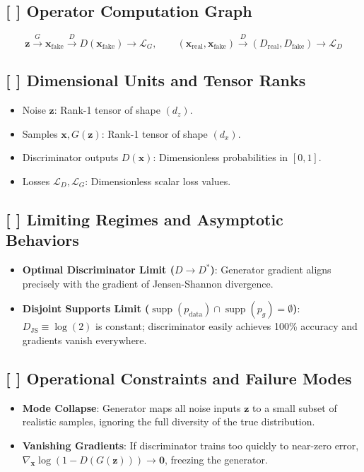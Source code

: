 \documentclass[11pt,a4paper]{article}
\theoremstyle{definition}
\begin{document}
\subsection{[ ] Operator Computation Graph}
{\boldmath
\begin{equation}
\mathbf{z} \xrightarrow{G} \mathbf{x}_{\text{fake}} \xrightarrow{D} D(\mathbf{x}_{\text{fake}}) \longrightarrow \mathcal{L}_G, \qquad (\mathbf{x}_{\text{real}}, \mathbf{x}_{\text{fake}}) \xrightarrow{D} (D_{\text{real}}, D_{\text{fake}}) \longrightarrow \mathcal{L}_D
\end{equation}
}

\subsection{[ ] Dimensional Units and Tensor Ranks}
\begin{itemize}
    \item Noise $\mathbf{z}$: Rank-1 tensor of shape $(d_z)$.
    \item Samples $\mathbf{x}, G(\mathbf{z})$: Rank-1 tensor of shape $(d_x)$.
    \item Discriminator outputs $D(\mathbf{x})$: Dimensionless probabilities in $[0, 1]$.
    \item Losses $\mathcal{L}_D, \mathcal{L}_G$: Dimensionless scalar loss values.
\end{itemize}

\subsection{[ ] Limiting Regimes and Asymptotic Behaviors}
\begin{itemize}
    \item \textbf{Optimal Discriminator Limit ($D \to D^*$)}: Generator gradient aligns precisely with the gradient of Jensen-Shannon divergence.
    \item \textbf{Disjoint Supports Limit ($\operatorname{supp}(p_{\text{data}}) \cap \operatorname{supp}(p_g) = \emptyset$)}: $D_{\text{JS}} \equiv \log(2)$ is constant; discriminator easily achieves 100\% accuracy and gradients vanish everywhere.
\end{itemize}

\subsection{[ ] Operational Constraints and Failure Modes}
\begin{itemize}
    \item \textbf{Mode Collapse}: Generator maps all noise inputs $\mathbf{z}$ to a small subset of realistic samples, ignoring the full diversity of the true distribution.
    \item \textbf{Vanishing Gradients}: If discriminator trains too quickly to near-zero error, $\nabla_{\mathbf{x}} \log(1 - D(G(\mathbf{z}))) \to \mathbf{0}$, freezing the generator.
\end{itemize}
\end{document}

